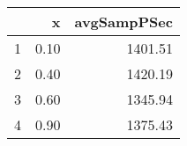 \begin{table}[h]
\centering
\begin{tabular}{rrr}
  \hline
 & x & avgSampPSec \\ 
  \hline
1 & 0.10 & 1401.51 \\ 
   \hline
2 & 0.40 & 1420.19 \\ 
   \hline
3 & 0.60 & 1345.94 \\ 
   \hline
4 & 0.90 & 1375.43 \\ 
   \hline
\end{tabular}
\end{table}

